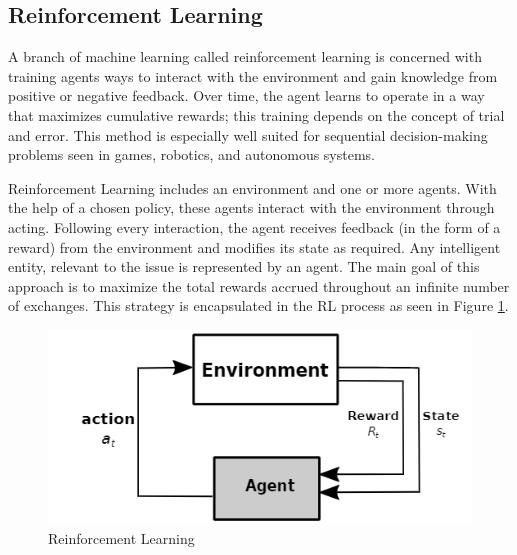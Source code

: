 \documentclass[a4paper,12pt]{report}%
\renewcommand{\\}{\vspace*{0.5\baselineskip} \newline}
\begin{document}
\subsection{Reinforcement Learning}
A branch of machine learning called reinforcement learning is concerned with training agents ways to interact with the environment and gain knowledge from positive or negative feedback. Over time, the agent learns to operate in a way that maximizes cumulative rewards; this training depends on the concept of trial and error. This method is especially well suited for sequential decision-making problems seen in games, robotics, and autonomous systems.

\noindent Reinforcement Learning includes an environment and one or more agents. With the help of a chosen policy, these agents interact with the environment through acting. Following every interaction, the agent receives feedback (in the form of a reward) from the environment and modifies its state as required. Any intelligent entity, relevant to the issue is represented by an agent. The main goal of this approach is to maximize the total rewards accrued throughout an infinite number of exchanges. This strategy is encapsulated in the RL process as seen in Figure \ref{Reinforcement Learning}.\cite{43} 

\begin{figure}[h]
\centering
	\includegraphics[scale=1.5]{images/Reinforcement Learning.png}\\
	\begin{footnotesize}
		\caption{Reinforcement Learning \cite{43}}
		\label{Reinforcement Learning}
	\end{footnotesize}
\end{figure}
\end{document}
